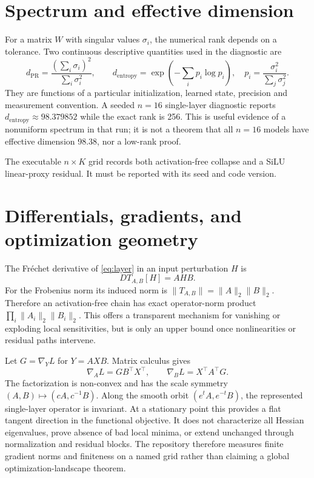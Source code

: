 \documentclass[11pt]{article}
\begin{document}
\section{Spectrum and effective dimension}
For a matrix $W$ with singular values $\sigma_i$, the numerical rank depends on
a tolerance. Two continuous descriptive quantities used in the diagnostic are
\[
 d_{\mathrm{PR}}=\frac{(\sum_i\sigma_i)^2}{\sum_i\sigma_i^2},\qquad
 d_{\mathrm{entropy}}=\exp\left(-\sum_i p_i\log p_i\right),\quad
 p_i=\frac{\sigma_i^2}{\sum_j\sigma_j^2}.
\]
They are functions of a particular initialization, learned state, precision and
measurement convention. A seeded $n=16$ single-layer diagnostic reports
$d_{\mathrm{entropy}}\approx98.379852$ while the exact rank is 256. This is
useful evidence of a nonuniform spectrum in that run; it is not a theorem that
all $n=16$ models have effective dimension 98.38, nor a low-rank proof.

The executable $n\times K$ grid records both activation-free collapse and a
SiLU linear-proxy residual. It must be reported with its seed and code version.

\section{Differentials, gradients, and optimization geometry}
The Fr\'echet derivative of \eqref{eq:layer} in an input perturbation $H$ is
\[
 D T_{A,B}[H]=AHB.
\]
For the Frobenius norm its induced norm is
$\|T_{A,B}\|=\|A\|_2\|B\|_2$. Therefore an activation-free chain has exact
operator-norm product $\prod_i\|A_i\|_2\|B_i\|_2$. This offers a transparent
mechanism for vanishing or exploding local sensitivities, but is only an upper
bound once nonlinearities or residual paths intervene.

Let $G=\nabla_Y L$ for $Y=AXB$. Matrix calculus gives
\[
 \nabla_A L=G B^\top X^\top,\qquad
 \nabla_B L=X^\top A^\top G.
\]
The factorization is non-convex and has the scale symmetry
$(A,B)\mapsto(cA,c^{-1}B)$. Along the smooth orbit
$(e^tA,e^{-t}B)$, the represented single-layer operator is invariant. At a
stationary point this provides a flat tangent direction in the functional
objective. It does not characterize all Hessian eigenvalues, prove absence of
bad local minima, or extend unchanged through normalization and residual
blocks. The repository therefore measures finite gradient norms and finiteness
on a named grid rather than claiming a global optimization-landscape theorem.
\end{document}
